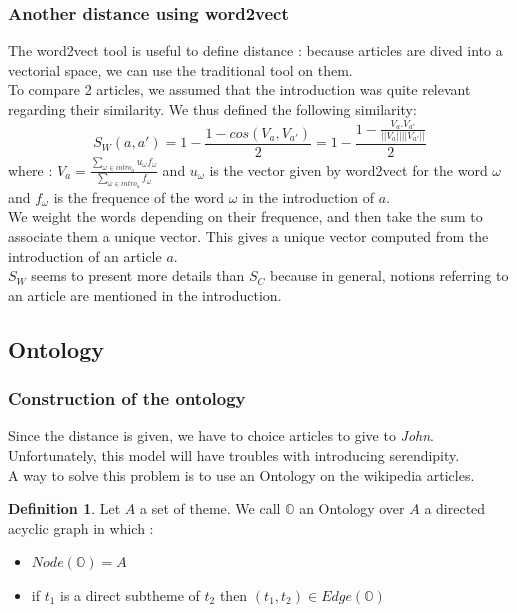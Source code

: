 \documentclass[11pt]{article}
\theoremstyle{plain}
\theoremstyle{definition}
\newtheorem{defn}{Definition}[section]
\theoremstyle{remark}
\begin{document}
\subsubsection{Another distance using word2vect}
The word2vect tool is useful to define distance : because articles are dived into a vectorial space, we can use the traditional tool on them. \\
To compare 2 articles, we assumed that the introduction was quite relevant regarding their similarity. We thus defined the following similarity:
$$S_W(a,a') = 1- \frac{1 - cos(V_a,V_{a'})}{2}= 1-\frac{1-\frac{V_a.V_{a'}}{||V_a||||V_{a'}||}}{2}$$
where : $V_a = \frac{\sum_{\omega\in intro_a}u_\omega f_\omega}{\sum_{\omega\in intro_a}f_\omega}$ and $u_\omega$ is the vector given by word2vect for the word $\omega$ and $f_\omega$ is the frequence of the word $\omega$ in the introduction of $a$.\\
We weight the words depending on their frequence, and then take the sum to associate them a unique vector. This gives a unique vector computed from the introduction of an article $a$.\\
$S_W$ seems to present more details than $S_C$ because in general, notions referring to an article are mentioned in the introduction. 


\subsection{Ontology}
\subsubsection{Construction of the ontology}
Since the distance is given, we have to choice articles to give to \textit{John}. Unfortunately, this model will have troubles with introducing serendipity.\\
A way to solve this problem is to use an Ontology on the wikipedia articles.

\vspace*{5mm}
\begin{defn}
  Let $A$ a set of theme. We call $\mathbb{O}$ an Ontology over $A$ a directed acyclic graph in which :
  \begin{itemize}
  \item $ Node(\mathbb{O}) = A$
  \item if $t_1$ is a direct subtheme of $t_2$ then $(t_1,t_2) \in Edge(\mathbb{O})$
  \end{itemize}
\end{defn}
\end{document}
